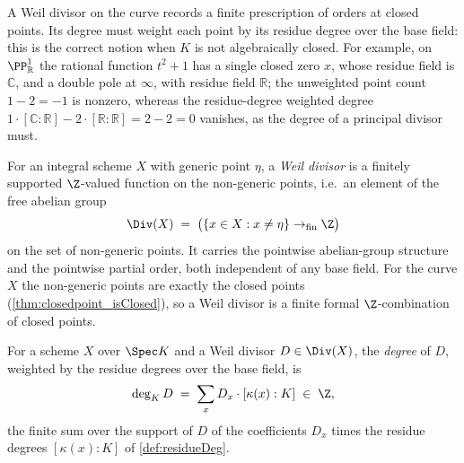 A Weil divisor on the curve records a finite prescription of orders at closed points. Its degree
must weight each point by its residue degree over the base field: this is the correct notion when
\(K\) is not algebraically closed. For example, on \(\PP^1_{\mathbb{R}}\) the rational function
\(t^2 + 1\) has a single closed zero \(x\), whose residue field is \(\mathbb{C}\), and a double
pole at \(\infty\), with residue field \(\mathbb{R}\); the unweighted point count \(1 - 2 = -1\)
is nonzero, whereas the residue-degree weighted degree
\(1 \cdot [\mathbb{C} : \mathbb{R}] - 2 \cdot [\mathbb{R} : \mathbb{R}] = 2 - 2 = 0\)
vanishes, as the degree of a principal divisor must.

\begin{definition}
  \label{def:curveDivisor}
  \leanok
  For an integral scheme \(X\) with generic point \(\eta\), a \emph{Weil divisor} is a finitely
  supported \(\Z\)-valued function on the non-generic points, i.e.\ an element of the free abelian
  group
  \[
    \Div(X) \;=\; \bigl(\{ x \in X : x \neq \eta \} \to_{\mathrm{fin}} \Z\bigr)
  \]
  on the set of non-generic points. It carries the pointwise abelian-group structure and the
  pointwise partial order, both independent of any base field. For the curve \(X\) the
  non-generic points are exactly the closed points (\ref{thm:closedpoint_isClosed}), so a Weil
  divisor is a finite formal \(\Z\)-combination of closed points.
\end{definition}

\begin{definition}
  \label{def:curveDivisor_deg}
  \leanok
  For a scheme \(X\) over \(\Spec K\) and a Weil divisor \(D \in \Div(X)\), the \emph{degree} of
  \(D\), weighted by the residue degrees over the base field, is
  \[
    \deg_K D \;=\; \sum_{x} D_x \cdot [\kappa(x) : K] \;\in\; \Z ,
  \]
  the finite sum over the support of \(D\) of the coefficients \(D_x\) times the residue degrees
  \([\kappa(x) : K]\) of \ref{def:residueDeg}.
\end{definition}

